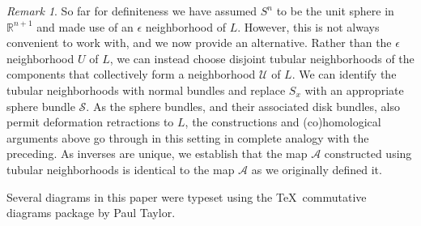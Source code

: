 \documentclass[12pt]{article}
\theoremstyle{plain}
\theoremstyle{definition}
\theoremstyle{remark}
\newtheorem{remark}[theorem]{Remark}
\newcommand{\R}{\mathbb{R}}
\newcommand{\bd}{\partial}
\newcommand{\mc}[1]{\mathcal{#1}}
\begin{document}
\begin{remark}
So far for definiteness we have assumed $S^n$ to be the unit sphere in $\R^{n+1}$ and made use of an $\epsilon$ neighborhood of $L$.
However, this is not always convenient to work with, and we now provide an alternative.
Rather than the $\epsilon$ neighborhood $U$ of $L$, we can instead choose disjoint tubular neighborhoods of the components that collectively form a neighborhood $\mc U$ of $L$.
We can identify the tubular neighborhoods with normal bundles and replace $S_x$ with an appropriate sphere bundle $\mc S$.
As the sphere bundles, and their associated disk bundles, also permit deformation retractions to $L$, the constructions and (co)homological arguments above go through in this setting in complete analogy with the preceding.
As inverses are unique, we establish that the map $\mc A$ constructed using tubular neighborhoods is identical to the map $\mc A$ as we originally defined it.
\end{remark}








\begin{comment}

Suppose V is a cycle transverse to N that bounds. Then there is a Z transverse to N that realizes it:

Choose Y so that \bd Y \sqcup  -V \in Q. Y may not be transverse.

Do a universal homotopy on Y \sqcup V so that Y becomes transverse and the trace of V is transverse. Let Y’ and V’ be the results and let W be the trace of the V homotopy. Let Z = Y’ \sqcup -W, which is transverse. Also \bd Y’ \sqcup -V’ is in Q.

Then \bd Z \sqcup -V is
                                                          (\bd Y’ \sqcup - V’ \sqcup V \sqcup -V)
Which is in Q.


\end{comment}




Several diagrams in this paper were typeset using the \TeX\, commutative
diagrams package by Paul Taylor.
\end{document}
